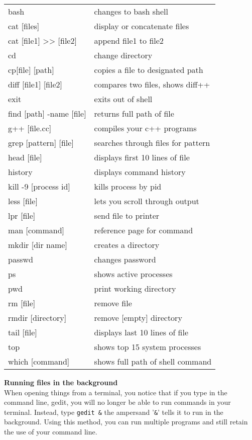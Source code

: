 \documentclass[a4paper]{article}
\begin{document}
\begin{landscape}
\begin{multicols}{3}
\begin{tabular}{ l l }
bash & changes to bash shell\\
cat [files] & display or concatenate files\\
cat [file1] >> [file2] & append file1 to file2\\
cd & change directory\\
cp[file] [path] & copies a file to designated path\\
diff [file1] [file2] & compares two files, shows diff++\\
exit & exits out of shell\\
find [path] -name [file] & returns full path of file\\
g++ [file.cc] & compiles your c++ programs\\
grep [pattern] [file] & searches through files for pattern\\
head [file] & displays first 10 lines of file\\
history & displays command history\\
kill -9 [process id] & kills process by pid\\
less [file] & lets you scroll through output\\
lpr [file] & send file to printer\\
man [command] & reference page for command\\
mkdir [dir name] & creates a directory\\
passwd & changes password\\
ps & shows active processes\\
pwd & print working directory\\
rm [file] & remove file\\
rmdir [directory] & remove [empty] directory\\
tail [file] & displays last 10 lines of file\\
top & shows top 15 system processes\\
which [command] & shows full path of shell command\\
\end{tabular}

\vspace{2mm}
\textbf{Running files in the background}\\
When opening things from a terminal, you notice that if
you type in the command line, gedit, you will no
longer be able to run commands in your terminal. Instead,
type \verb+gedit &+ the ampersand '\verb+&+' tells it to run in the
background. Using this method, you can run multiple
programs and still retain the use of your command line.


\end{multicols}
\end{landscape}
\end{document}
